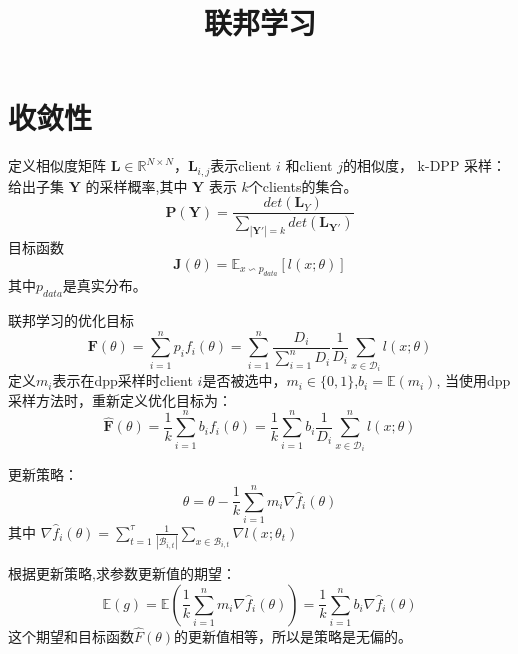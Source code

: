\documentclass{article}
\title{联邦学习}
\newcommand{\R}{\mathbb{R}} %
\begin{document}
	\maketitle
	
	\section{收敛性}

		定义相似度矩阵 $\mathbf{L}\in \R^{N \times N}$，$\mathbf{L}_{i,j}$表示client $i$ 和client $j$的相似度，
		k-DPP 采样：给出子集 $\mathbf{Y}$ 的采样概率,其中 $\mathbf{Y}$ 表示 $k$个clients的集合。
		\begin{equation}
			\mathbf{P}(\mathbf{Y}) = \frac{det(\mathbf{L}_Y)}{\sum_{|\mathbf{Y}'|=k} det(\mathbf{L}_{\mathbf{Y}'})}
		\end{equation}
		目标函数
		\begin{equation}
			\mathbf{J}(\theta) = \mathbb{E}_{x\backsim p_{data}}[l(x;\theta)]
		\end{equation}
		其中$p_{data}$是真实分布。
		
		联邦学习的优化目标
		\begin{equation}
			\mathbf{F}(\theta) = \sum_{i=1}^{n}p_if_i(\theta)=\sum_{i=1}^{n}\frac{D_i}{\sum_{i=1}^nD_i}\frac{1}{D_i}\sum_{x\in \mathcal{D}_i}l(x;\theta)
		\end{equation}
		定义$m_i$表示在dpp采样时client $i$是否被选中，$m_i \in \{0,1\}$,$b_i = \mathbb{E}(m_i)$,
		当使用dpp采样方法时，重新定义优化目标为：
		\begin{equation}
			\widehat{\mathbf{F}}(\theta) =\frac{1}{k}\sum_{i=1}^n{}b_if_i({\theta})=\frac{1}{k}\sum_{i=1}^{n}b_i\frac{1}{D_i}\sum_{x\in \mathcal{D}_i}^{n}l(x;\theta)
		\end{equation}
		
		更新策略：
		\begin{equation}
			\theta = \theta - \frac{1}{k}\sum_{i=1}^{n}m_i\nabla \widehat{f}_i(\theta) 
		\end{equation}
		其中 $\nabla \widehat{f}_i(\theta)=\sum_{t=1}^\tau\frac{1}{|\mathcal{B}_{i,t}|}\sum_{x\in \mathcal{B}_{i,t}}\nabla l(x;\theta_t)$
		
		
		根据更新策略,求参数更新值的期望：
		\begin{equation}
			\mathbb{E}(g) = \mathbb{E}(\frac{1}{k}\sum_{i=1}^nm_i\nabla \widehat{f}_i(\theta))=\frac{1}{k}\sum_{i=1}^{n}b_i\nabla \widehat{f}_i(\theta)
		\end{equation}
		这个期望和目标函数$\widehat{F}(\theta)$的更新值相等，所以是策略是无偏的。
		
\end{document}
